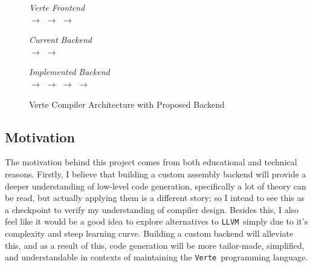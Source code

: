 \documentclass[11pt]{article}
\newcommand{\verte}{\texttt{Verte}}
\newcommand{\llvm}{\texttt{LLVM}}
\begin{document}
\begin{figure}[h]
	\centering
	\small
	\setlength{\fboxsep}{6pt}
	\setlength{\fboxrule}{0.5pt}

	\textit{Verte Frontend}\\[0.4em]
	$\rightarrow$
	$\rightarrow$
	$\rightarrow$
	\vspace{1.2em}

	\textit{Current Backend}\\[0.4em]
	$\rightarrow$
	$\rightarrow$
	\vspace{1.5em}

	\textit{Implemented Backend}\\[0.4em]
	$\rightarrow$
	$\rightarrow$
	$\rightarrow$
	$\rightarrow$
	\vspace{1.2em}

	\caption{Verte Compiler Architecture with Proposed Backend}
	\label{fig:architecture}
\end{figure}

\subsection{Motivation}

The motivation behind this project comes from both educational and technical reasons. Firstly, I believe that building a custom assembly backend will provide a deeper understanding of low-level code generation, specifically a lot of theory can be read, but actually applying them is a different story; so I intend to see this as a checkpoint to verify my understanding of compiler design. Besides this, I also feel like it would be a good idea to explore alternatives to \llvm\ simply due to it's complexity and steep learning curve. Building a custom backend will alleviate this, and as a result of this, code generation will be more tailor-made, simplified, and understandable in contexts of maintaining the \verte\ programming language.
\end{document}
